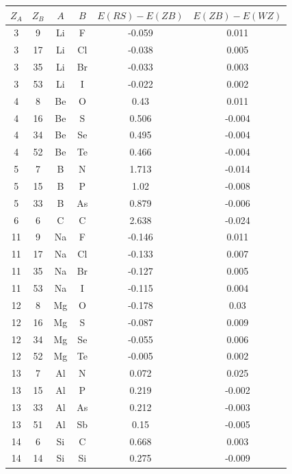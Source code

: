 \documentclass[11pt,oneside,czech,american]{book} %
\theoremstyle{definition} %
\theoremstyle{definition}
\begin{document}
\begin{table} 
	\scriptsize
	\begin{minipage}{0.5\textwidth}
		\centering
		\begin{tabular}{cccccc}
			\toprule
			$Z_A$ &   $Z_B$ & $A$   & $B$   &      $E(RS) - E(ZB)$ &     $E(ZB)-E(WZ)$ \\
			\midrule
			3 &     9 & Li  & F   & -0.059 &  0.011 \\
			3 &    17 & Li  & Cl  & -0.038 &  0.005 \\
			3 &    35 & Li  & Br  & -0.033 &  0.003 \\
			3 &    53 & Li  & I   & -0.022 &  0.002 \\
			4 &     8 & Be  & O   &  0.43  &  0.011 \\
			4 &    16 & Be  & S   &  0.506 & -0.004 \\
			4 &    34 & Be  & Se  &  0.495 & -0.004 \\
			4 &    52 & Be  & Te  &  0.466 & -0.004 \\
			5 &     7 & B   & N   &  1.713 & -0.014 \\
			5 &    15 & B   & P   &  1.02  & -0.008 \\
			5 &    33 & B   & As  &  0.879 & -0.006 \\
			6 &     6 & C   & C   &  2.638 & -0.024 \\
			11 &     9 & Na  & F   & -0.146 &  0.011 \\
			11 &    17 & Na  & Cl  & -0.133 &  0.007 \\
			11 &    35 & Na  & Br  & -0.127 &  0.005 \\
			11 &    53 & Na  & I   & -0.115 &  0.004 \\
			12 &     8 & Mg  & O   & -0.178 &  0.03  \\
			12 &    16 & Mg  & S   & -0.087 &  0.009 \\
			12 &    34 & Mg  & Se  & -0.055 &  0.006 \\
			12 &    52 & Mg  & Te  & -0.005 &  0.002 \\
			13 &     7 & Al  & N   &  0.072 &  0.025 \\
			13 &    15 & Al  & P   &  0.219 & -0.002 \\
			13 &    33 & Al  & As  &  0.212 & -0.003 \\
			13 &    51 & Al  & Sb  &  0.15  & -0.005 \\
			14 &     6 & Si  & C   &  0.668 &  0.003 \\
			14 &    14 & Si  & Si  &  0.275 & -0.009 \\

\end{tabular}
\end{minipage}
\end{table}
\end{document}

